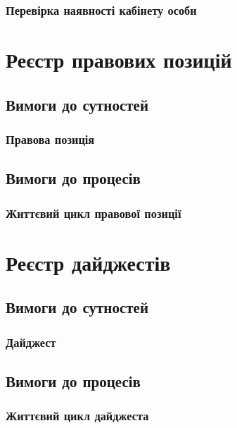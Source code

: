 \documentclass{article}
\begin{document}
\subsubsection{Перевірка наявності кабінету особи}

\newpage
\section{Реєстр правових позицій}

\subsection{Вимоги до сутностей}

\subsubsection{Правова позиція}

\subsection{Вимоги до процесів}

\subsubsection{Життєвий цикл правової позиції}

\newpage
\section{Реєстр дайджестів}

\subsection{Вимоги до сутностей}

\subsubsection{Дайджест}

\subsection{Вимоги до процесів}

\subsubsection{Життєвий цикл дайджеста}
\end{document}
